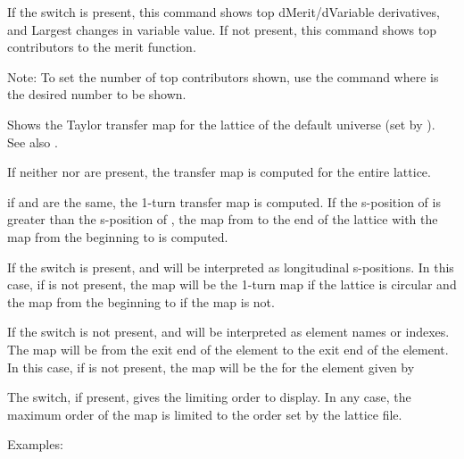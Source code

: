 {{{\begin{description}
{\vskip -0.2in

If the  switch is present, this command shows top
dMerit/dVariable derivatives, and Largest changes in variable value.
If not present, this command
shows top contributors to the merit function.

Note: To set the number of top contributors shown, use the command
 where  is the desired number to
be shown.


\item[show taylor\_map \{-order <n\_order>\} \{-s\} \{loc1 \{loc2\}\}] \Newline

\vskip -0.2in

Shows the Taylor transfer map for the  lattice of the
default universe (set by ).
See also .

If neither  nor  are present, the transfer map is
computed for the entire lattice.

if  and  are the same, the 1-turn transfer map is
computed. If the s-position of  is greater than the
s-position of , the map from  to the end of the
lattice with the map from the beginning to  is computed.

If the  switch is present,  and  will be
interpreted as longitudinal s-positions. In this case, if  is
not present, the map will be the 1-turn map if the lattice is circular
and the map from the beginning to  if the map is not.

If the  switch is not present,  and  will be
interpreted as element names or indexes. The map will be from the
exit end of the  element to the exit end of the 
element. In this case, if  is not present, the map will be
the for the element given by 

The  switch, if present, gives the limiting order to
display. In any case, the maximum order of the map is limited to the
order set by the lattice file.

Examples:

}
\end{description}}}}
